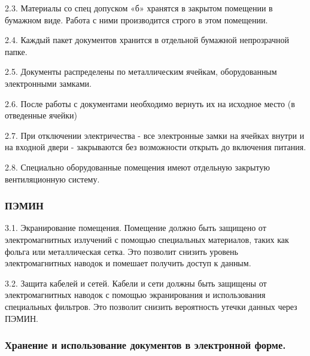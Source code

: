 \documentclass[utf8,14pt,a4paper,oneside,russian]{book}
\begin{document}
2.3. Материалы со спец допуском «б» хранятся в закрытом помещении в бумажном
виде. Работа с ними производится строго в этом помещении.

2.4. Каждый пакет документов хранится в отдельной бумажной непрозрачной папке.

2.5. Документы распределены по металлическим ячейкам, оборудованным
электронными замками.

2.6. После работы с документами необходимо вернуть их на исходное место
(в отведенные ячейки)

2.7. При отключении электричества - все электронные замки на ячейках
внутри и на входной двери - закрываются без возможности открыть до
включения питания.

2.8. Специально оборудованные помещения имеют отдельную закрытую
вентиляционную систему.

\subsubsection{ПЭМИН}

3.1. Экранирование помещения. Помещение должно быть защищено от
электромагнитных излучений с помощью специальных материалов, таких
как фольга или металлическая сетка. Это позволит снизить уровень
электромагнитных наводок и помешает получить доступ к данным.

3.2. Защита кабелей и сетей. Кабели и сети должны быть защищены от
электромагнитных наводок с помощью экранирования и использования
специальных фильтров. Это позволит снизить вероятность утечки
данных через ПЭМИН.





\subsubsection{Хранение и использование документов в электронной форме.}
\end{document}
